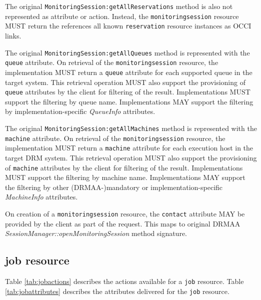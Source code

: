 \documentclass[10pt]{article}
\newcommand{\h}[1]{\lstinline|#1|}
\begin{document}
The original \h{MonitoringSession:getAllReservations} method is also not represented as attribute or action. Instead, the \h{monitoringsession} resource MUST return the references all known \h{reservation} resource instances as OCCI links. 

The original \h{MonitoringSession:getAllQueues} method is represented with the \h{queue} attribute. On retrieval of the \h{monitoringsession} resource, the implementation MUST return a \h{queue} attribute for each supported queue in the target system. This retrieval operation MUST also support the provisioning of \h{queue} attributes by the client for filtering of the result. Implementations MUST support the filtering by queue name. Implementations MAY support the filtering by implementation-specific \emph{QueueInfo} attributes.

The original \h{MonitoringSession:getAllMachines} method is represented with the \h{machine} attribute. On retrieval of the \h{monitoringsession} resource, the implementation MUST return a \h{machine} attribute for each execution host in the target DRM system. This retrieval operation MUST also support the provisioning of \h{machine} attributes by the client for filtering of the result. Implementations MUST support the filtering by machine name. Implementations MAY support the filtering by other (DRMAA-)mandatory or implementation-specific \emph{MachineInfo} attributes.

On creation of a \h{monitoringsession} resource, the \h{contact} attribute MAY be provided by the client as part of the request. This maps to original DRMAA \emph{SessionManager::openMonitoringSession} method signature.


\subsection{job resource}

Table \ref{tab:jobactions} describes the actions available for a \h{job} resource. Table \ref{tab:jobattributes} describes the attributes delivered for the \h{job} resource.
\end{document}
